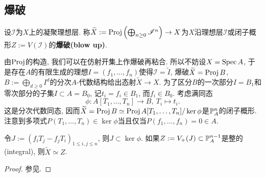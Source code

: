 \subsection{爆破}
\begin{definition}
    设$\mathscr{I}$为$X$上的凝聚理想层.
    称$\tilde{X} := \proj\left( \bigoplus_{n\ge 0} \mathscr{I}^n\right)\to X$为$X$沿理想层$\mathscr{I}$或闭子概形$Z := V(\mathscr{I})$的\textbf{爆破(blow up)}.
\end{definition}
由$\proj$的构造, 我们可以在仿射开集上作爆破再粘合.
所以不妨设$X = \spec A$, 于是存在$A$的有限生成的理想$I = (f_1, \dots, f_n)$使得$\mathscr{I} = \tilde{I}$, 爆破$\tilde{X} = \proj B$,
$B := \bigoplus_{d\ge 0}I^d$的分次$A$-代数结构给出态射$\tilde{X}\to X$.
为了区分$B$的一次部分$I = B_1$和零次部分的子集$I\subset A = B_0$, 记$t_i = f_i\in B_1$, 而$f_i\in B_0$.
考虑满同态\[\phi : A[T_1, \dots, T_n]\to B,\ T_i\mapsto t_i.\]
这是分次代数同态, 因而$\tilde{X} = \proj B\simeq\proj A[T_1,\dots, T_n]/\ker\phi$是$\P_A^n$的闭子概形.
注意到多项式$P(T_1, \dots, T_n)\in\ker\phi$当且仅当$P(f_1, \dots, f_n) = 0\in A$.

\begin{proposition}\label{blow up eq proj if integral}
    令$J := (f_iT_j-f_jT_i)_{1\le i, j\le n}$, 则$J\subset\ker\phi$.
    如果$Z:=V_+(J)\subset\P_A^{n-1}$是整的(integral), 则$\tilde{X}\simeq Z$.
\end{proposition}
\begin{proof}
    参见\cite[Lemma 8.1.2]{Liu02}.
\end{proof}


